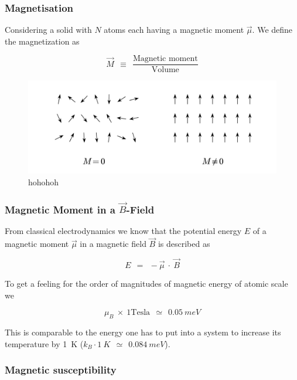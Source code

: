 \documentclass[10pt]{report}
\numberwithin{equation}{chapter}
\begin{document}
\subsubsection{Magnetisation}

Considering a solid with $N$ atoms each having a magnetic moment $\vec{\mu}$. We define the magnetization as 

\begin{equation}
  \vec{M} ~~\equiv~~ \frac{\text{Magnetic moment}}{\text{Volume}}
\end{equation}

\begin{figure}
  \centering
  \includegraphics[width=0.8\linewidth]{../img/mag_in_solid.pdf}
  \caption{hohohoh}
\end{figure}

\subsubsection{Magnetic Moment in a $\vec{B}$-Field}


From classical electrodynamics we know that the potential energy $E$ of a magnetic moment $\vec{\mu}$ in a magnetic field $\vec{B}$ is described as

\begin{equation}
  E ~~=~~ - \vec{\mu} ~\cdot~ \vec{B}
\end{equation}

To get a feeling for the order of magnitudes of magnetic energy of atomic scale we 

\begin{equation*}
  \mu_B ~\times~ 1 \text{Tesla} ~~\simeq~~ \SI{0.05}{meV}
\end{equation*}

This is comparable to the energy one has to put into a system to increase its temperature by \SI[mode=text]{1}{K} ($ k_B \cdot \SI{1}{K} ~~\simeq~~ \SI{0.084}{meV}$).


\subsubsection{Magnetic susceptibility}
\end{document}
